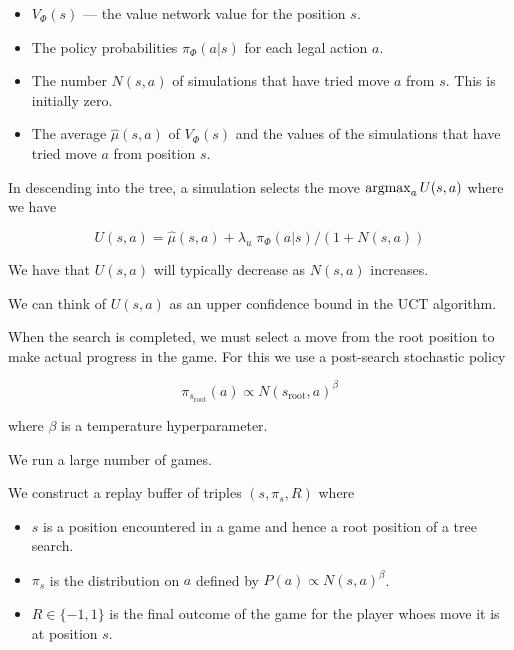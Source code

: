 {\begin{itemize}
\item $V_\Phi(s)$ --- the value network value for the position $s$.
\item The policy probabilities $\pi_\Phi(a|s)$ for each legal action $a$.
\item The number $N(s,a)$ of simulations that have tried move $a$ from $s$. This is initially zero.
\item The average $\hat{\mu}(s,a)$ of $V_\Phi(s)$ and the values of the simulations that have
  tried move $a$ from position $s$.
\end{itemize}


In descending into the tree, a simulation selects the move $\operatorname*{argmax}_a U(s,a)$ where we have

\vfill
$$U(s,a) =   \hat{\mu}(s,a) + \lambda_u\; \pi_\Phi(a|s)/(1+N(s,a))$$

\vfill
We have that $U(s,a)$ will typically decrease as $N(s,a)$ increases.

\vfill
We can think of $U(s,a)$ as an upper confidence bound in the UCT algorithm.


When the search is completed, we must select a move from the root position to make actual progress in the game.  For this we use a post-search stochastic policy

\vfill
$$\pi_{s_{\mathrm{root}}}(a) \propto N(s_{\mathrm{root}},a)^\beta$$

\vfill
where $\beta$ is a temperature hyperparameter.


We run a large number of games.

\vfill
We construct a replay buffer of triples $(s,\pi_{s},R)$ where

\vfill
\begin{itemize}
\item $s$ is a position encountered in a game and hence a root position of a tree search.

\vfill
\item $\pi_{s}$ is the distribution on $a$ defined by $P(a) \propto N(s,a)^\beta$.

\vfill
\item $R \in \{-1,1\}$ is the final outcome of the game for the player whoes move it is at position $s$.
\end{itemize}

}
